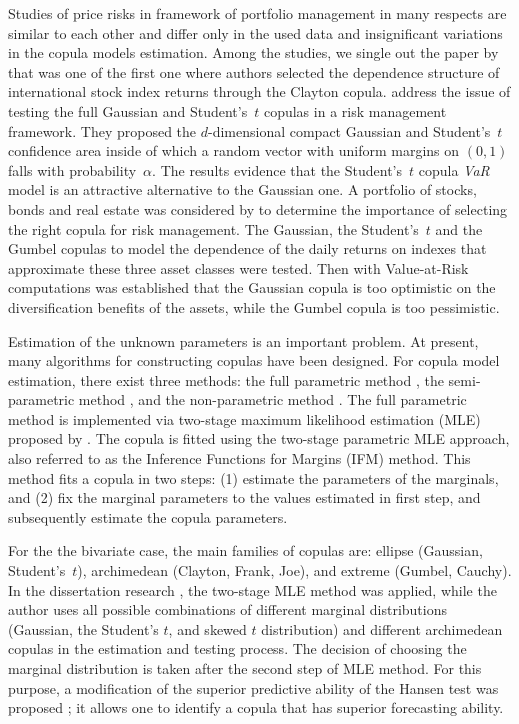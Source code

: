 Studies of price risks in framework of portfolio management \cite{Ane2003, Kole2007, Lourme2016, Xu2008} in many respects are similar to each other and differ only in the used data and insignificant variations in the copula models estimation. 
Among the studies, we single out the paper by \cite{Ane2003} that was one of the first one where authors selected the dependence structure of international stock index returns through the Clayton copula. 
\cite{Lourme2016} address the issue of testing the full Gaussian and Student's~$t$ copulas in a risk management framework. 
They proposed the $d$-dimensional compact Gaussian and Student's~$t$ confidence area inside of which a random vector with uniform margins on $(0, 1)$ falls with probability~$\alpha$. 
The results evidence that the Student's~$t$ copula \textit{VaR} model is an attractive alternative to the Gaussian one.
A portfolio of stocks, bonds and real estate was considered by \cite{Kole2007} to determine the importance of selecting the right copula for risk management. 
The Gaussian, the Student’s~$t$ and the Gumbel copulas to model the dependence of the daily returns on indexes that approximate these three asset classes were tested. 
Then with Value-at-Risk computations was established that the Gaussian copula is too optimistic on the diversification benefits of the assets, while the Gumbel copula is too pessimistic.  

Estimation of the unknown parameters is an important problem. 
At present, many algorithms for constructing copulas have been designed.
For copula model estimation, there exist three methods: the full parametric method \cite{Patton2006}, the semi-parametric method \cite{Lourme2016, Chen2006}, and the non-parametric method \cite{Fermanian2003, Kim2007}.
The full parametric method is implemented via two-stage maximum likelihood estimation (MLE) proposed by \cite{Joe1997, Joe2014}. %
The copula is fitted using the two-stage parametric MLE approach, also referred to as the Inference Functions for Margins (IFM) method.
This method fits a copula in two steps: (1) estimate the parameters of the marginals, and (2) fix the marginal parameters to the values estimated in first step, and subsequently estimate the copula parameters.

For the the bivariate case, the main families of copulas are: ellipse (Gaussian, Student's~$t$), archimedean (Clayton, Frank, Joe), and extreme (Gumbel, Cauchy).
In the dissertation research \cite{Xu2008}, the two-stage  MLE method was applied, while the author uses all possible combinations of different marginal distributions (Gaussian, the Student's $t$, and skewed $t$ distribution) and different archimedean copulas in the estimation and testing process. 
The decision of choosing the marginal distribution is taken after the second step of MLE method.
For this purpose, a modification of the superior predictive ability of the Hansen test was proposed \cite{Hansen2005}; it allows one to identify a copula that has superior forecasting ability.

